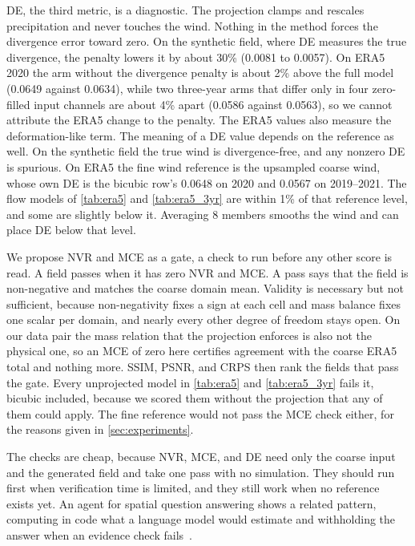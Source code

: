 \documentclass[sigconf,nonacm]{acmart}
\begin{document}
DE, the third metric, is a diagnostic. The projection clamps and rescales precipitation and never touches the wind. Nothing in the method forces the divergence error toward zero. On the synthetic field, where DE measures the true divergence, the penalty lowers it by about 30\% (0.0081 to 0.0057). On ERA5 2020 the arm without the divergence penalty is about 2\% above the full model (0.0649 against 0.0634), while two three-year arms that differ only in four zero-filled input channels are about 4\% apart (0.0586 against 0.0563), so we cannot attribute the ERA5 change to the penalty. The ERA5 values also measure the deformation-like term. The meaning of a DE value depends on the reference as well. On the synthetic field the true wind is divergence-free, and any nonzero DE is spurious. On ERA5 the fine wind reference is the upsampled coarse wind, whose own DE is the bicubic row's 0.0648 on 2020 and 0.0567 on 2019--2021. The flow models of \cref{tab:era5} and \cref{tab:era5_3yr} are within 1\% of that reference level, and some are slightly below it. Averaging 8 members smooths the wind and can place DE below that level.

We propose NVR and MCE as a gate, a check to run before any other score is read. A field passes when it has zero NVR and MCE. A pass says that the field is non-negative and matches the coarse domain mean. Validity is necessary but not sufficient, because non-negativity fixes a sign at each cell and mass balance fixes one scalar per domain, and nearly every other degree of freedom stays open. On our data pair the mass relation that the projection enforces is also not the physical one, so an MCE of zero here certifies agreement with the coarse ERA5 total and nothing more. SSIM, PSNR, and CRPS then rank the fields that pass the gate. Every unprojected model in \cref{tab:era5} and \cref{tab:era5_3yr} fails it, bicubic included, because we scored them without the projection that any of them could apply. The fine reference would not pass the MCE check either, for the reasons given in \cref{sec:experiments}.

The checks are cheap, because NVR, MCE, and DE need only the coarse input and the generated field and take one pass with no simulation. They should run first when verification time is limited, and they still work when no reference exists yet. An agent for spatial question answering shows a related pattern, computing in code what a language model would estimate and withholding the answer when an evidence check fails~\citep{sharma2026spatial}.
\end{document}
